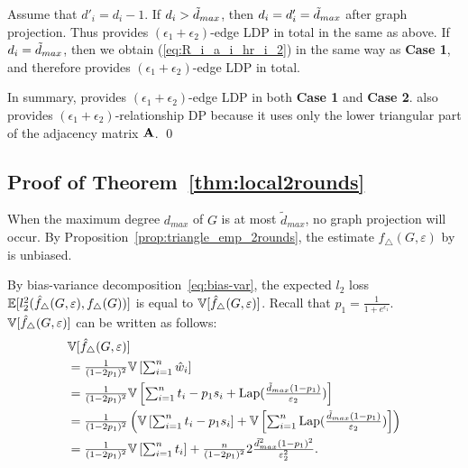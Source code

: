 {Assume that $d'_i = d_i - 1$. 
If $d_i > \tilde{d}_{max}$, then $d_i = d'_i = \tilde{d}_{max}$ after graph projection. 
Thus  provides $(\epsilon_1 + \epsilon_2)$-edge LDP in total in the same as above. 
If $d_i = \tilde{d}_{max}$, then we obtain (\ref{eq:R_i_a_i_hr_i_2}) in the same way as \textbf{Case 1}, and therefore  provides $(\epsilon_1 + \epsilon_2)$-edge LDP in total.

\smallskip
In summary,  provides $(\epsilon_1 + \epsilon_2)$-edge LDP in both \textbf{Case 1} and \textbf{Case 2}. 
 also provides $(\epsilon_1 + \epsilon_2)$-relationship DP 
because it uses only the lower triangular part of the adjacency matrix $\mathbf{A}$. \qed

\subsection{Proof of Theorem~\ref{thm:local2rounds}}
  When the maximum degree $d_{max}$ of $G$ is at most $\tilde{d}_{max}$, no graph
  projection will occur.
  By Proposition~\ref{prop:triangle_emp_2rounds}, the estimate
  $f_\triangle(G,\varepsilon)$ by  is unbiased.

  By bias-variance
  decomposition~\eqref{eq:bias-var}, the expected $l_2$ loss
  $\mathbb{E}[l_2^2(\hat{f}_\triangle(G, \varepsilon), f_\triangle(G))]$ is equal to
  $\mathbb{V}[\hat{f}_\triangle(G,\varepsilon)]$.
  Recall that $p_1 = \frac{1}{1+e^{\epsilon_1}}$.
  $\mathbb{V}[\hat{f}_\triangle(G,\varepsilon)]$ 
  can be written as follows:
  \begin{align}
    &\mathbb{V}[\hat{f}_\triangle(G,\varepsilon)] \\
    &= \textstyle{\frac{1}{(1-2p_1)^2}\mathbb{V}\left[\sum_{i=1}^n
    \hat{w}_i\right]} \nonumber \\
    &= \textstyle{\frac{1}{(1-2p_1)^2}\mathbb{V}\left[\sum_{i=1}^n
    t_i - p_1 s_i +
    \textrm{Lap}(\frac{\tilde{d}_{max}(1-p_1)}{\varepsilon_2})\right]} \nonumber \\
    &= \textstyle{\frac{1}{(1-2p_1)^2}\left(\mathbb{V}\left[\sum_{i=1}^n
    t_i - p_1 s_i \right] +
    \mathbb{V}\left[\sum_{i=1}^n
    \textrm{Lap}(\frac{\tilde{d}_{max}(1-p_1)}{\varepsilon_2})\right]\right)} \nonumber \\
    &= \textstyle{\frac{1}{(1-2p_1)^2}\mathbb{V}\left[\sum_{i=1}^n
    t_i \right] + \frac{n}{(1-2p_1)^2}
    2\frac{\tilde{d}_{max}^2(1-p_1)^2}{\varepsilon_2^2}}.\label{eq:local2rounds-var}
  \end{align}

}

